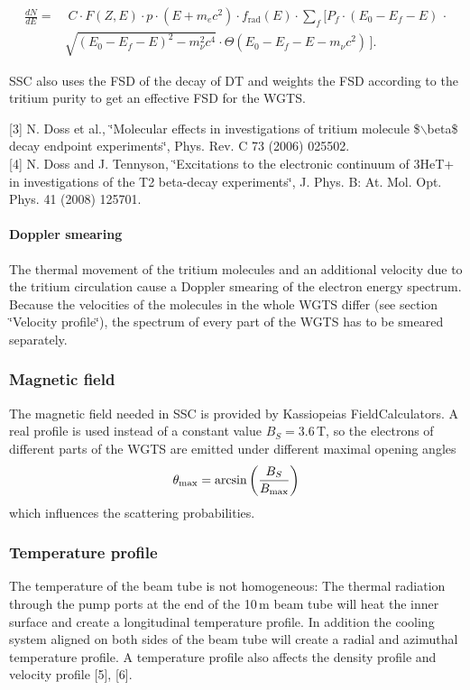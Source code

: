 \begin{equation}
	\begin{split}
	\frac{dN}{dE} =& \;C\cdot F(Z,E)\cdot p \cdot (E + m_e c^2)\cdot f_{\text{rad}}(E) \cdot \sum_f [ P_f \cdot(E_0 - E_f -E)\, \cdot  \\
	&  \sqrt{(E_0 - E_f -E)^2 - m_\nu^2 c^4} \cdot \Theta(E_0 -E_f -E - m_\nu c^2)\,].
	\end{split}
	\label{eq:spektrumFSD}
\end{equation}

SSC also uses the FSD of the decay of DT and weights the FSD according to the tritium purity to get an effective FSD for the WGTS.

\mbox{[}3\mbox{]} N. Doss et al., \char`\"{}Molecular effects in investigations of tritium molecule \$$\backslash$beta\$ decay endpoint experiments\char`\"{}, Phys. Rev. C 73 (2006) 025502.\\
 \mbox{[}4\mbox{]} N. Doss and J. Tennyson, \char`\"{}Excitations to the electronic continuum of 3HeT+ in investigations of the T2 beta-\/decay experiments\char`\"{}, J. Phys. B: At. Mol. Opt. Phys. 41 (2008) 125701.

\paragraph{Doppler smearing}\label{_s_s_cmain_doppler}
The thermal movement of the tritium molecules and an additional velocity due to the tritium circulation cause a Doppler smearing of the electron energy spectrum. Because the velocities of the molecules in the whole WGTS differ (see section \char`\"{}Velocity profile\char`\"{}), the spectrum of every part of the WGTS has to be smeared separately.


\subsubsection{Magnetic field}\label{_s_s_cmain_magneticfield}
The magnetic field needed in SSC is provided by Kassiopeias FieldCalculators. A real profile is used instead of a constant value $B_S=3.6$\,T, so the electrons of different parts of the WGTS are emitted under different maximal opening angles \[ \theta_{\rm{max}} = \arcsin\left(\frac{B_S}{B_{\rm{max}}}\right) \] which influences the scattering probabilities.

\subsubsection{Temperature profile}\label{_s_s_cmain_temperatureprofile}
The temperature of the beam tube is not homogeneous: The thermal radiation through the pump ports at the end of the 10\,m beam tube will heat the inner surface and create a longitudinal temperature profile. In addition the cooling system aligned on both sides of the beam tube will create a radial and azimuthal temperature profile. A temperature profile also affects the density profile and velocity profile \mbox{[}5\mbox{]}, \mbox{[}6\mbox{]}.

